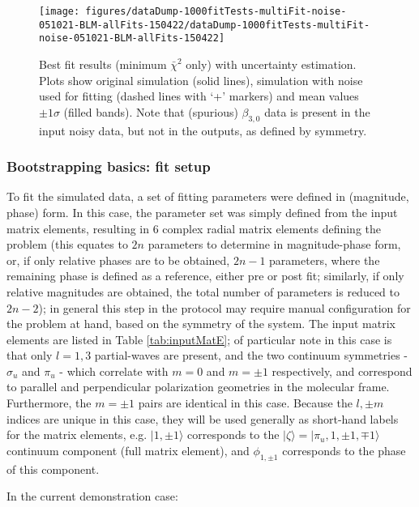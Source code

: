 \documentclass[10pt]{article}
\begin{document}
\begin{figure}[H]
\begin{center}
\texttt{[image: figures/dataDump-1000fitTests-multiFit-noise-051021-BLM-allFits-150422/dataDump-1000fitTests-multiFit-noise-051021-BLM-allFits-150422]}
\caption{{Best fit results (minimum \(\bar{\chi}^2\) only) with uncertainty
estimation. Plots show original simulation (solid lines), simulation
with noise used for fitting (dashed lines with `+' markers) and mean
values~\(\pm1\sigma\) (filled bands). Note that (spurious)
\(\beta_{3,0}\) data is present in the input noisy data, but not in
the outputs, as defined by symmetry.
{\label{743962}}%
}}
\end{center}
\end{figure}

\subsubsection{Bootstrapping basics: fit setup}

To fit the simulated data, a set of fitting parameters were defined in (magnitude, phase) form. In this case, the parameter set was simply defined from the input matrix elements, resulting in 6 complex radial matrix elements defining the problem (this equates to $2n$ parameters to determine in magnitude-phase form, or, if only relative phases are to be obtained, $2n-1$ parameters, where the remaining phase is defined as a reference, either pre or post fit; similarly, if only relative magnitudes are obtained, the total number of parameters is reduced to $2n-2$); in general this step in the protocol may require manual configuration for the problem at hand, based on the symmetry of the system. The input matrix elements are listed in Table \ref{tab:inputMatE}; of particular note in this case is that only $l=1,3$ partial-waves are present, and the two continuum symmetries - $\sigma_u$ and $\pi_u$ - which correlate with $m=0$ and $m=\pm1$ respectively, and correspond to parallel and perpendicular polarization geometries in the molecular frame. Furthermore, the $m=\pm1$ pairs are identical in this case. Because the $l,\pm m$ indices are unique in this case, they will be used generally as short-hand labels for the matrix elements, e.g. $|1,\pm1\rangle$ corresponds to the $|\zeta\rangle = |\pi_u,1,\pm 1,\mp 1 \rangle$ continuum component (full matrix element), and $\phi_{1,\pm1}$ corresponds to the phase of this component.

In the current demonstration case:
\end{document}
